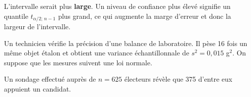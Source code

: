 \begin{questions}
\begin{parts}
\begin{solution}
L'intervalle serait plus \textbf{large}. Un niveau de confiance plus élevé signifie un quantile $t_{\alpha/2;\,n-1}$ plus grand, ce qui augmente la marge d'erreur et donc la largeur de l'intervalle.
\end{solution}

\end{parts}


\pageblanche
\question\label{variance} Un technicien vérifie la précision d'une balance de laboratoire. Il pèse 16 fois un même objet étalon et obtient une variance échantillonnale de $s^2=0{,}015$ g$^2$. On suppose que les mesures suivent une loi normale.



\pageblanche
\question\label{proportion} Un sondage effectué auprès de $n=625$ électeurs révèle que 375 d'entre eux appuient un candidat.

\end{questions}
